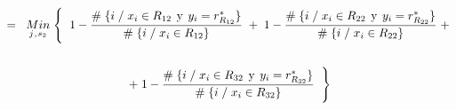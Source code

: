 \documentclass[
  11pt,
  a4paper,
]{article}
\begin{document}
\begin{gather*}
=\hspace{0.2cm}   \underset{j \hspace{0.02cm},\hspace{0.02cm} s_2}  {Min} \hspace{0.1cm} \Biggl\{ \hspace{0.2cm}     1 - \dfrac{\# \hspace{0.1 cm}\lbrace i \hspace{0.1 cm}/\hspace{0.1 cm} x_i \in R_{12} \hspace{0.15 cm}\text{y}\hspace{0.15 cm} y_i = r^*_{R_{12}} \rbrace}{\# \hspace{0.1 cm}\lbrace i \hspace{0.1 cm}/\hspace{0.1 cm} x_i \in R_{12}  \rbrace}      \hspace{0.1cm} +  \hspace{0.1cm} 1 - \dfrac{\# \hspace{0.1 cm}\lbrace i \hspace{0.1 cm}/\hspace{0.1 cm} x_i \in R_{22} \hspace{0.15 cm}\text{y}\hspace{0.15 cm} y_i = r^*_{R_{22}} \rbrace}{\# \hspace{0.1 cm}\lbrace i \hspace{0.1 cm}/\hspace{0.1 cm} x_i \in R_{22}  \rbrace} \hspace{0.1cm} +    \hspace{0.1cm}   \\ \\ + \hspace{0.1 cm}   1 - \dfrac{\# \hspace{0.1 cm}\lbrace i \hspace{0.1 cm}/\hspace{0.1 cm} x_i \in R_{32} \hspace{0.15 cm}\text{y}\hspace{0.15 cm} y_i = r^*_{R_{32}} \rbrace}{\# \hspace{0.1 cm}\lbrace i \hspace{0.1 cm}/\hspace{0.1 cm} x_i \in R_{32}  \rbrace}  \hspace{0.2cm}  \Biggl\}   \\ \\

\end{gather*}
\end{document}
